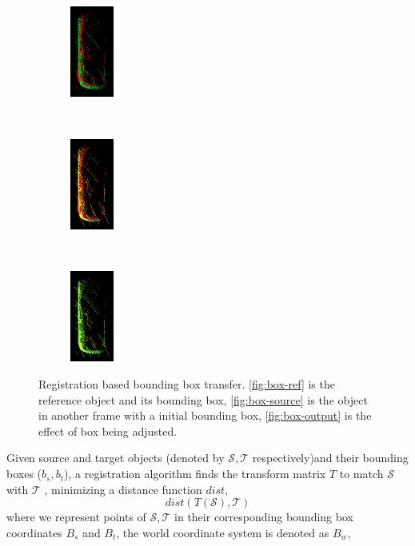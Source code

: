 \documentclass[letterpaper, 10 pt, conference]{ieeeconf}  %
\begin{document}
\begin{figure}[htpb]
	\begin{subfigure}[t]{0.18\linewidth}
		\includegraphics[height=3cm]{./figures/reg-input}\\
		\caption{}\label{fig:reg-input}
	\end{subfigure}\hfill
	~
	\begin{subfigure}[t]{0.18\linewidth}
		\includegraphics[height=3cm]{./figures/reg-tran}\\
		\caption{}\label{fig:reg-tran}
	\end{subfigure}\hfill
	~
	\begin{subfigure}[t]{0.18\linewidth}
		\includegraphics[height=3cm]{./figures/reg-result}\\
		\caption{}\label{fig:reg-output}
	\end{subfigure}\hfill

	
	\caption{Registration based bounding box transfer. \ref{fig:box-ref} is the reference object and its bounding box, \ref{fig:box-source} is the object in another frame with a initial  bounding box, \ref{fig:box-output} is the effect of box being adjusted.}
\end{figure}


Given source and target objects (denoted by $\mathcal{S,T}$ respectively)and their bounding boxes ($b_s,b_t$), a registration algorithm finds the transform matrix $T$ to match $\mathcal{S}$ with $\mathcal{T}$ , minimizing a distance function $dist$,
$$dist(T(\mathcal{S}),\mathcal{T})$$
where we represent points of $\mathcal{S,T}$ in their corresponding bounding box coordinates $B_s$ and $B_t$, the world coordinate system is denoted as $B_w$,
\end{document}
